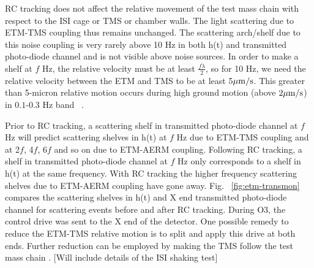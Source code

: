 \documentclass[12pt]{iopart}
\begin{document}
RC tracking does not affect the relative movement of the test mass chain with respect to the ISI cage or TMS or chamber walls. The light scattering due to ETM-TMS coupling thus remains unchanged. The scattering arch/shelf due to this noise coupling is very rarely above 10 Hz in both h(t) and transmitted photo-diode channel and is not visible above noise sources. In order to make a shelf at $f$ Hz, the relative velocity must be at least $\frac{f{\lambda}}{2}$, so for 10 Hz, we need the relative velocity between the ETM and TMS to be at least $5\mu{\rm m/s}$. This greater than 5-micron relative motion occurs during high ground motion (above $2\mu{\rm m/s}$) in $0.1$-$0.3$ Hz band ~\cite{alogsid_trans}.
\par

Prior to RC tracking, a scattering shelf in transmitted photo-diode channel at $f$ Hz will predict scattering shelves in h(t) at $f$ Hz due to ETM-TMS coupling and at 2$f$, 4$f$, 6$f$ and so on due to ETM-AERM coupling. Following RC tracking, a shelf in transmitted photo-diode channel at $f$ Hz only corresponds to a shelf in h(t) at the same frequency. With RC tracking the higher frequency scattering shelves due to ETM-AERM coupling have gone away. Fig. ~\ref{fig:etm-transmon}
compares the scattering shelves in h(t) and X end transmitted photo-diode channel for scattering events before and after RC tracking. 
During O3, the control drive was sent to the X end of the detector. One possible remedy to reduce the ETM-TMS relative motion is to split and apply this drive at both ends. Further reduction can be employed by making the TMS follow the test mass chain \cite{alogae_tmsx,alogsid_tmsx}. [Will include details of the ISI shaking test]
\par 

\vspace{0.5cm}
 
\end{document}

